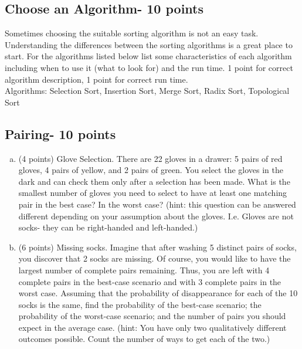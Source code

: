 \documentclass[12pt]{amsart}
\begin{document}
\subsection{Choose an Algorithm- 10 points} 
Sometimes choosing the suitable sorting algorithm is not an easy task. Understanding the differences between the sorting algorithms is a great place to start. For the algorithms listed below list some characteristics of each algorithm including when to use it (what to look for) and the run time. 1 point for correct algorithm description, 1 point for correct run time. \\

Algorithms: Selection Sort, Insertion Sort, Merge Sort, Radix Sort, Topological Sort 
\\

\subsection{Pairing- 10 points}
\begin{enumerate}[a.] 
\item (4 points) Glove Selection. There are 22 gloves in a drawer: 5 pairs of red gloves, 4
pairs of yellow, and 2 pairs of green. You select the gloves in the dark and
can check them only after a selection has been made. What is the smallest
number of gloves you need to select to have at least one matching pair in
the best case? In the worst case? (hint: this question can be answered different depending on your assumption about the gloves. I.e. Gloves are not socks- they can be right-handed and left-handed.) \\

\item (6 points) Missing socks. Imagine that after washing 5 distinct pairs of socks, you
discover that 2 socks are missing. Of course, you would like to have
the largest number of complete pairs remaining. Thus, you are left with
4 complete pairs in the best-case scenario and with 3 complete pairs in
the worst case. Assuming that the probability of disappearance for each
of the 10 socks is the same, find the probability of the best-case scenario;
the probability of the worst-case scenario; and the number of pairs you should
expect in the average case. (hint: You have only two qualitatively different outcomes possible. Count the number of ways to get each of the two.)
\end{enumerate} 
\end{document}
